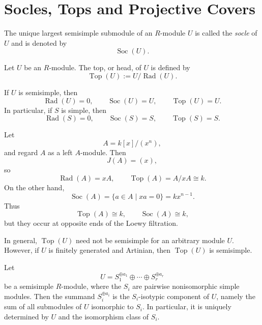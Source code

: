 \section{Socles, Tops and Projective Covers}

\begin{definition}
    The unique largest semisimple submodule of an $R$-module $U$ is called the
    \emph{socle} of $U$ and is denoted by
    \[
        \operatorname{Soc}(U).
    \]
\end{definition}

\begin{definition}
    Let $U$ be an $R$-module. The top, or head, of $U$ is defined by
    \[
        \operatorname{Top}(U):=U/\operatorname{Rad}(U).
    \]
\end{definition}

\begin{example}
    If $U$ is semisimple, then
    \[
        \operatorname{Rad}(U)=0,
        \qquad
        \operatorname{Soc}(U)=U,
        \qquad
        \operatorname{Top}(U)=U.
    \]
    In particular, if $S$ is simple, then
    \[
        \operatorname{Rad}(S)=0,
        \qquad
        \operatorname{Soc}(S)=S,
        \qquad
        \operatorname{Top}(S)=S.
    \]
\end{example}

\begin{example}
    Let
    \[
        A=k[x]/(x^n),
    \]
    and regard $A$ as a left $A$-module. Then
    \[
        J(A)=(x),
    \]
    so
    \[
        \operatorname{Rad}(A)=xA,
        \qquad
        \operatorname{Top}(A)=A/xA\cong k.
    \]
    On the other hand,
    \[
        \operatorname{Soc}(A)=\{a\in A\mid xa=0\}=kx^{n-1}.
    \]
    Thus
    \[
        \operatorname{Top}(A)\cong k,
        \qquad
        \operatorname{Soc}(A)\cong k,
    \]
    but they occur at opposite ends of the Loewy filtration.
\end{example}

\begin{remark}
    In general, $\operatorname{Top}(U)$ need not be semisimple for an arbitrary module
    $U$. However, if $U$ is finitely generated and Artinian, then
    $\operatorname{Top}(U)$ is semisimple.
\end{remark}

\begin{lemma}
    Let
    \[
        U=S_1^{\oplus a_1}\oplus \cdots \oplus S_r^{\oplus a_r}
    \]
    be a semisimple \(R\)-module, where the \(S_i\) are pairwise nonisomorphic
    simple modules. Then the summand \(S_i^{\oplus a_i}\) is the \(S_i\)-isotypic
    component of \(U\), namely the sum of all submodules of \(U\) isomorphic to
    \(S_i\). In particular, it is uniquely determined by \(U\) and the isomorphism
    class of \(S_i\).
\end{lemma}

